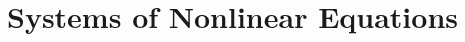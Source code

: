 %
%
%
%
%
%
%
%
%
%
%
%
%
%
%
%
%
%
%
%
%
%
%
%
%
%
%
%
%
%
%
%
%
%
%
%
%
%

%

\section{Systems of Nonlinear Equations}

